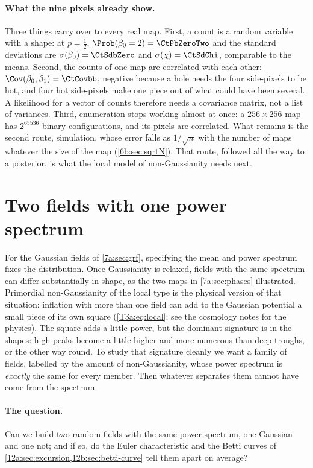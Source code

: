 \paragraph{What the nine pixels already show.} Three things carry over to every real map. First, a count is a random
variable with a shape: at $p=\tfrac12$, $\Prob(\beta_0=2)=\CtPbZeroTwo$ and the standard deviations are
$\sigma(\beta_0)=\CtSdbZero$ and $\sigma(\chi)=\CtSdChi$, comparable to the means. Second, the counts of one map are
correlated with each other: $\Cov(\beta_0,\beta_1)=\CtCovbb$, negative because a hole needs the four side-pixels to be
hot, and four hot side-pixels make one piece out of what could have been several. A likelihood for a vector of counts
therefore needs a covariance matrix, not a list of variances. Third, enumeration stops working almost at once: a
$256\times256$ map has $2^{65536}$ binary configurations, and its pixels are correlated. What remains is the second
route, simulation, whose error falls as $1/\sqrt n$ with the number of maps whatever the size of the map
(\cref{6b:sec:sqrtN}). That route, followed all the way to a posterior, is what the local model of non-Gaussianity needs next.
\section{Two fields with one power spectrum}
\label{12c:sec:twins}

For the Gaussian fields of \cref{7a:sec:grf}, specifying the mean and power
spectrum fixes the distribution. Once Gaussianity is relaxed, fields with the
same spectrum can differ substantially in shape, as the two maps in
\cref{7a:sec:phases} illustrated. Primordial non-Gaussianity of the local type is the physical version of that
situation: inflation with more than one field can add to the Gaussian potential a small piece of its own square
(\eqref{T3a:eq:local}; see the cosmology notes for the physics). The square adds a little power, but the dominant
signature is in the shapes: high peaks become a little higher and more numerous than deep troughs, or the other way
round. To study that signature cleanly we want a family of fields, labelled by the amount of non-Gaussianity, whose
power spectrum is \emph{exactly} the same for every member. Then whatever separates them cannot have come from the
spectrum.

\paragraph{The question.} Can we build two random fields with the same power spectrum, one Gaussian and one not; and
if so, do the Euler characteristic and the Betti curves of \cref{12a:sec:excursion,12b:sec:betti-curve} tell them
apart on average?

